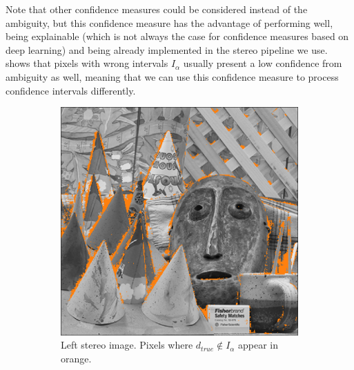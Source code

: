 Note that other confidence measures could be considered instead of the ambiguity, but this confidence measure has the advantage of performing well, being explainable (which is not always the case for confidence measures based on deep learning) and being already implemented in the stereo pipeline we use.  shows that pixels with wrong intervals $I_\alpha$ usually present a low confidence from ambiguity as well, meaning that we can use this confidence measure to process confidence intervals differently.

\begin{figure}
    \centering
    \begin{subfigure}[t]{0.3\linewidth}
        \centering
        \includegraphics[width=\linewidth]{Images/Chap_5/wrong_intervals_no_reg.png}
        \caption{Left stereo image. Pixels where $d_{true}\not\in I_\alpha$ appear in orange.}
        \label{fig:wrong_intervals}
    \end{subfigure}\hfill
    \begin{subfigure}[t]{0.3\linewidth}
        \centering

\end{subfigure}
\end{figure}
